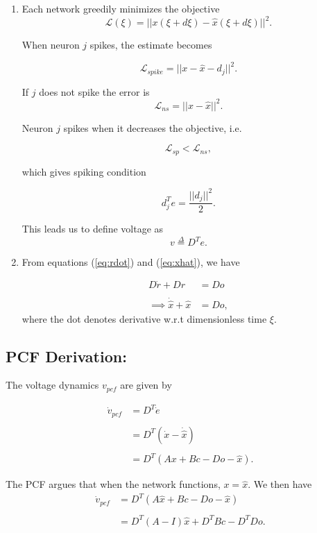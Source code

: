 {\begin{enumerate}
    
	\item Each network greedily minimizes the objective 
	$$
	\mathcal{L}(\xi) = || x(\xi+d\xi) - \hat{x}(\xi + d\xi)||^2.
	$$
	
	When neuron $j$ spikes, the estimate becomes
	
	$$
	\mathcal{L}_{spike} = ||x - \hat{x} - d_j||^2.
	$$
	
	If $j$ does not spike the error is 
	$$	
   	\mathcal{L}_{ns} = ||x - \hat{x}||^2.
    $$
    
	Neuron $j$ spikes when it decreases the objective, i.e.
	
	$$
	\mathcal{L}_{sp} < \mathcal{L}_{ns},
	$$
	
	which gives spiking condition
	
	$$
	d_j^T e = \frac{||d_j||^2}{2}.
	$$
    
	This leads us to define voltage as 
	$$
		v\overset{\Delta}{=}  D^T e.	
	$$    
    
    \item From equations (\ref{eq:rdot}) and (\ref{eq:xhat}), we have
    
    \begin{align*}
        D \dot{r} + D r &= Do \\
        \\
        \implies \dot{\hat{x}} + \hat{x} &= Do,
    \end{align*}
    where the dot denotes derivative w.r.t dimensionless time $\xi$.


\end{enumerate}

\subsection{PCF Derivation:}
The voltage dynamics $v_{pcf}$ are given by 

\begin{align*}
\dot{v}_{pcf} &=
D^T \dot{e}
\\
\\
&= 
D^T \left(\dot{x} - \dot{\hat{x}}\right)
\\
\\
&=
D^T \left( A x + B c - Do - \hat{x}\right).
\end{align*}

The PCF argues that when the network functions, $x = \hat{x}$. We then have
\begin{align*}
\dot{v}_{pcf} &=
D^T \left( A \hat{x} + B c - Do - \hat{x}\right)
\\
\\
&= 
D^T \left( A - I\right)\hat{x} + D^T B c - D^T D o.
\end{align*}

}
